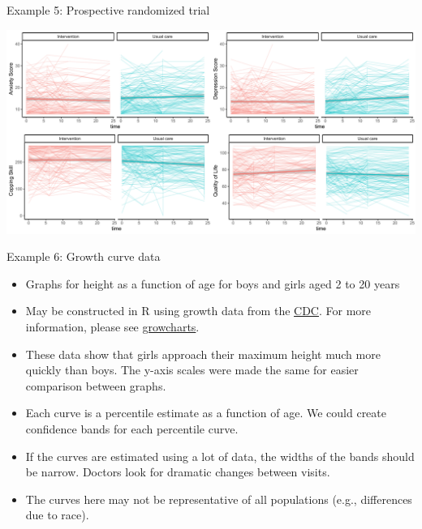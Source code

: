 \documentclass[
  9pt,
  ignorenonframetext,
]{beamer}
\providecommand{\tightlist}{%
  \setlength{\itemsep}{0pt}\setlength{\parskip}{0pt}}
\begin{document}
\begin{frame}{}
\protect\hypertarget{section-5}{}
\begin{block}{Example 5: Prospective randomized trial}
\protect\hypertarget{example-5-prospective-randomized-trial-1}{}
\tiny

\begin{center}\includegraphics[width=1\linewidth]{figs_L1/unnamed-chunk-3-1} \end{center}

\tiny
\end{block}
\end{frame}

\begin{frame}{}
\protect\hypertarget{section-6}{}
\begin{block}{Example 6: Growth curve data}
\protect\hypertarget{example-6-growth-curve-data}{}
\begin{itemize}
\tightlist
\item
  Graphs for height as a function of age for boys and girls aged 2 to 20
  years
\item
  May be constructed in R using growth data from the
  \href{http://www.cdc.gov/}{CDC}. For more information, please see
  \href{http://www.cdc.gov/growthcharts/}{growcharts}.
\item
  These data show that girls approach their maximum height much more
  quickly than boys. The y-axis scales were made the same for easier
  comparison between graphs.
\item
  Each curve is a percentile estimate as a function of age. We could
  create confidence bands for each percentile curve.\\
\item
  If the curves are estimated using a lot of data, the widths of the
  bands should be narrow. Doctors look for dramatic changes between
  visits.
\item
  The curves here may not be representative of all populations (e.g.,
  differences due to race).
\end{itemize}
\end{block}
\end{frame}
\end{document}
